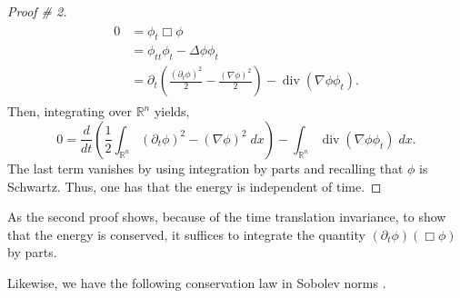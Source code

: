 \documentclass{article}
\begin{document}
\begin{proof}[Proof \# 2]
	\begin{align*}
		\begin{split}
			0 &= \phi_{t}\Box \phi \\
			&= \phi_{tt}\phi_{t}- \Delta \phi \phi_{t} \\
			&= \partial_{t}\left(\frac{(\partial_{t}\phi)^{2}}{2} - \frac{(\nabla \phi)^{2}}{2}\right) - \operatorname{div}(\nabla \phi \phi_{t}). 
		\end{split}
	\end{align*}
	Then, integrating over $\mathbb{R}^{n}$ yields, 
	\begin{equation*}
		0 = \frac{d}{dt}\left(\frac{1}{2}\int_{\mathbb{R}^{n}}(\partial_{t}\phi)^{2} - (\nabla \phi)^{2}\;dx\right) - \int_{\mathbb{R}^{n}}\operatorname{div}(\nabla \phi \phi_{t})\;dx. 
	\end{equation*}
	The last term vanishes by using integration by parts and recalling that $\phi$ is Schwartz. Thus, one has that the energy is independent of time. 
\end{proof}

\begin{remark}
	As the second proof shows, because of the time translation invariance, to show that the energy is conserved, it suffices to integrate the quantity $(\partial_{t}\phi)(\Box\phi)$ by parts. 
\end{remark}

Likewise, we have the following conservation law in Sobolev norms \cite{Holzegel2021}. 
\end{document}
